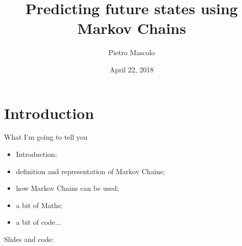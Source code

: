 \documentclass[10pt]{beamer}
\author[PM]{Pietro Mascolo}
\title[Predicting the future]{Predicting future states using Markov Chains}
\institute[Optum]{\textbf{\Large{Optum Ireland Ltd.}}}
\date{\tiny{April 22, 2018}}
\newif\ifplacelogo %
\begin{document}
	\begin{frame}
		\titlepage
	\end{frame}


	\section{Introduction}
	
	\begin{frame}{What I'm going to tell you}
	\placelogofalse

		\begin{itemize}
			\item Introduction;
			\item definition and representation of Markov Chains;
			\item how Markov Chains can be used;
			\item a bit of Maths;
			\item a bit of code...
		\end{itemize}
		
		\begin{center}
		\vspace{0.5cm}
		Slides and code:\\
		\href{http://bit.ly/2H8giAW}{}
		\end{center}
	\end{frame}
\end{document}

